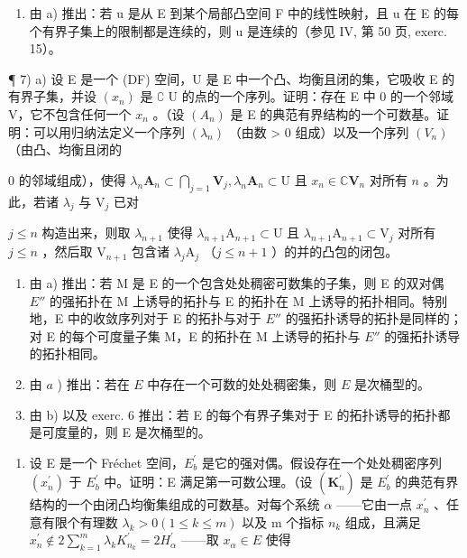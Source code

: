 \begin{enumerate}
\def\labelenumi{\alph{enumi})}
\setcounter{enumi}{1}
\tightlist
\item
  由 a) 推出：若 u 是从 E 到某个局部凸空间 F 中的线性映射，且 u 在 E 的每个有界子集上的限制都是连续的，则 u 是连续的（参见 IV, 第 50 页, exerc. 15）。
\end{enumerate}

¶ 7) a) 设 E 是一个 (DF) 空间，U 是 E 中一个凸、均衡且闭的集，它吸收 E 的有界子集，并设 \((x_n)\) 是 \(\complement\) U 的点的一个序列。证明：存在 E 中 0 的一个邻域 V，它不包含任何一个 \(x_n\) 。（设 \((A_n)\) 是 E 的典范有界结构的一个可数基。证明：可以用归纳法定义一个序列 \((\lambda_n)\) （由数 \textgreater{} 0 组成）以及一个序列 \((V_n)\) （由凸、均衡且闭的

0 的邻域组成），使得 \(\lambda_{n}\mathbf{A}_{n}\subset \bigcap_{j = 1}\mathbf{V}_{j},\lambda_{n}\mathbf{A}_{n}\subset \mathrm{U}\) 且 \(x_{n}\in \mathbb{C}\mathbf{V}_{n}\) 对所有 \(n\) 。为此，若诸 \(\lambda_{j}\) 与 \(\mathrm{V}_j\) 已对

\(j \leqslant n\) 构造出来，则取 \(\lambda_{n+1}\) 使得 \(\lambda_{n+1}\mathrm{A}_{n+1} \subset \mathrm{U}\) 且 \(\lambda_{n+1}\mathrm{A}_{n+1} \subset \mathrm{V}_j\) 对所有 \(j \leqslant n\) ，然后取 \(\mathrm{V}_{n+1}\) 包含诸 \(\lambda_j\mathrm{A}_j\) （\(j \leqslant n + 1\) ）的并的凸包的闭包。

\begin{enumerate}
\def\labelenumi{\alph{enumi})}
\setcounter{enumi}{1}
\item
  由 a) 推出：若 M 是 E 的一个包含处处稠密可数集的子集，则 E 的双对偶 \(E''\) 的强拓扑在 M 上诱导的拓扑与 E 的拓扑在 M 上诱导的拓扑相同。特别地，E 中的收敛序列对于 E 的拓扑与对于 \(E''\) 的强拓扑诱导的拓扑是同样的；对 E 的每个可度量子集 M，E 的拓扑在 M 上诱导的拓扑与 \(E''\) 的强拓扑诱导的拓扑相同。
\item
  由 \(a\) ) 推出：若在 \(E\) 中存在一个可数的处处稠密集，则 \(E\) 是次桶型的。
\item
  由 b) 以及 exerc. 6 推出：若 E 的每个有界子集对于 E 的拓扑诱导的拓扑都是可度量的，则 E 是次桶型的。
\end{enumerate}

\begin{enumerate}
\def\labelenumi{\arabic{enumi})}
\setcounter{enumi}{7}
\tightlist
\item
  设 E 是一个 Fréchet 空间，\(E_{b}^{\prime}\) 是它的强对偶。假设存在一个处处稠密序列 \((x_{n}^{\prime})\) 于 \(E_{b}^{\prime}\) 中。证明：E 满足第一可数公理。（设 \((\mathbf{K}_{n}^{\prime})\) 是 \(E_{b}^{\prime}\) 的典范有界结构的一个由闭凸均衡集组成的可数基。对每个系统 \(\alpha\) ——它由一点 \(x_{n}^{\prime}\) 、任意有限个有理数 \(\lambda_{k} > 0 (1 \leqslant k \leqslant m)\) 以及 m 个指标 \(n_{k}\) 组成，且满足 \(x_{n}^{\prime} \notin 2 \sum_{k=1}^{m} \lambda_{k} K_{n_{k}}^{\prime} = 2 H_{\alpha}^{\prime}\) ——取 \(x_{\alpha} \in E\) 使得
\end{enumerate}

